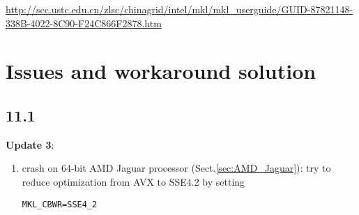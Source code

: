 \url{http://scc.ustc.edu.cn/zlsc/chinagrid/intel/mkl/mkl_userguide/GUID-87821148-338B-4022-8C90-F24C866F2878.htm}


\section{Issues and workaround solution}

\subsection{11.1}

{\bf Update 3}:
\begin{enumerate}
  \item crash on 64-bit AMD Jaguar processor (Sect.\ref{sec:AMD_Jaguar}): try to
  reduce optimization from AVX to SSE4.2 by setting
\begin{verbatim}
MKL_CBWR=SSE4_2
\end{verbatim}

 
\end{enumerate}